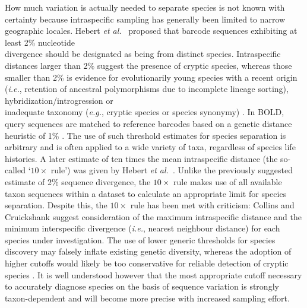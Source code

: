 How much variation is actually needed to separate species is not known with certainty because intraspecific sampling has generally been limited to narrow geographic locales. Hebert \textit{et al.}~\cite{hebert2003biological} proposed that barcode sequences exhibiting at least 2\% nucleotide \\ divergence should be designated as being from distinct species. Intraspecific distances larger than 2\% suggest the presence of cryptic species, whereas those smaller than 2\% is evidence for evolutionarily young species with a recent origin (\textit{i.e.}, retention of ancestral polymorphisms due to incomplete lineage sorting), hybridization/introgression or \\ inadequate taxonomy (\textit{e.g.}, cryptic species or species synonymy) \cite{hubert2015dna}. In BOLD, query sequences are matched to reference barcodes based on a genetic distance heuristic of 1\% \cite{ratnasingham2007bold}. The use of such threshold estimates for species separation is arbitrary and is often applied to a wide variety of taxa, regardless of species life histories. A later estimate of ten times the mean intraspecific distance (the so-called `$10\times$ rule') was given by Hebert \textit{et al.}~\cite{hebert2004identification}. Unlike the previously suggested estimate of 2\% sequence divergence, the $10\times$ rule makes use of all available taxon sequences within a dataset to calculate an appropriate limit for species separation. Despite this, the $10\times$ rule has been met with criticism: Collins and Cruickshank \cite{collins2013seven} suggest consideration of the maximum intraspecific distance and the minimum interspecific divergence (\textit{i.e.}, nearest neighbour distance) for each species under investigation. The use of lower generic thresholds for species discovery may falsely inflate existing genetic diversity, whereas the adoption of higher cutoffs would likely be too conservative for reliable detection of cryptic species \cite{april2011genetic}. It is well understood however that the most appropriate cutoff necessary to accurately diagnose species on the basis of sequence variation is strongly taxon-dependent \cite{hebert2003barcoding, hickerson2006dna, meyer2005dna} and will become more precise with increased sampling effort.



